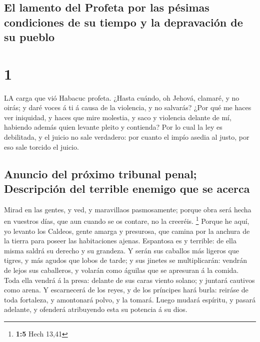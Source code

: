 \hypertarget{el-lamento-del-profeta-por-las-puxe9simas-condiciones-de-su-tiempo-y-la-depravaciuxf3n-de-su-pueblo}{%
\subsection{El lamento del Profeta por las pésimas condiciones de su
tiempo y la depravación de su
pueblo}\label{el-lamento-del-profeta-por-las-puxe9simas-condiciones-de-su-tiempo-y-la-depravaciuxf3n-de-su-pueblo}}

\hypertarget{section}{%
\section{1}\label{section}}

 LA carga que vió Habacuc profeta.  ¿Hasta
cuándo, oh Jehová, clamaré, y no oirás; y daré voces á ti á causa de la
violencia, y no salvarás?  ¿Por qué me haces ver iniquidad,
y haces que mire molestia, y saco y violencia delante de mí, habiendo
además quien levante pleito y contienda?  Por lo cual la ley
es debilitada, y el juicio no sale verdadero: por cuanto el impío asedia
al justo, por eso sale torcido el juicio.

\hypertarget{anuncio-del-pruxf3ximo-tribunal-penal-descripciuxf3n-del-terrible-enemigo-que-se-acerca}{%
\subsection{Anuncio del próximo tribunal penal; Descripción del terrible
enemigo que se
acerca}\label{anuncio-del-pruxf3ximo-tribunal-penal-descripciuxf3n-del-terrible-enemigo-que-se-acerca}}

 Mirad en las gentes, y ved, y maravillaos pasmosamente;
porque obra será hecha en vuestros días, que aun cuando se os contare,
no la creeréis. \footnote{\textbf{1:5} Hech 13,41}  Porque
he aquí, yo levanto los Caldeos, gente amarga y presurosa, que camina
por la anchura de la tierra para poseer las habitaciones ajenas.
 Espantosa es y terrible: de ella misma saldrá su derecho y
su grandeza.  Y serán sus caballos más ligeros que tigres, y
más agudos que lobos de tarde; y sus jinetes se multiplicarán: vendrán
de lejos sus caballeros, y volarán como águilas que se apresuran á la
comida.  Toda ella vendrá á la presa: delante de sus caras
viento solano; y juntará cautivos como arena.  Y
escarnecerá de los reyes, y de los príncipes hará burla: reiráse de toda
fortaleza, y amontonará polvo, y la tomará.  Luego mudará
espíritu, y pasará adelante, y ofenderá atribuyendo esta su potencia á
su dios.

